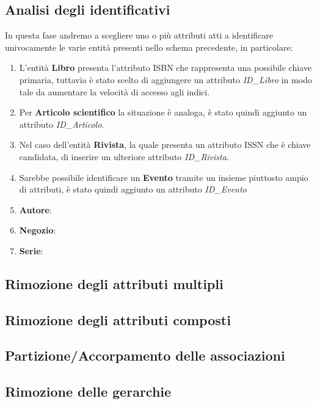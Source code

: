         \subsection{Analisi degli identificativi}
        In questa fase andremo a scegliere uno o più attributi atti a identificare univocamente
        le varie entità presenti nello schema precedente, in particolare:
            \begin{enumerate}
            \item L'entità \textbf{Libro} presenta l'attributo ISBN che rappresenta una possibile chiave primaria,
                  tuttavia è stato scelto di aggiungere un attributo \textit{ID\_Libro} in modo tale da aumentare
                  la velocità di accesso agli indici.
            \item Per \textbf{Articolo scientifico} la situazione è analoga, è stato quindi aggiunto un attributo
                  \textit{ID\_Articolo}.
            \item Nel caso dell'entità \textbf{Rivista}, la quale presenta un attributo ISSN che è chiave candidata,
                  di inserire un ulteriore attributo \textit{ID\_Rivista}.
            \item Sarebbe possibile identificare un \textbf{Evento} tramite un insieme piuttosto ampio di attributi, è
                  stato quindi aggiunto un attributo \textit{ID\_Evento}
            \item \textbf{Autore}: 
            \item \textbf{Negozio}:
            \item \textbf{Serie}: 
            \end{enumerate}
        \subsection{Rimozione degli attributi multipli}
            
        \subsection{Rimozione degli attributi composti}
            
        \subsection{Partizione/Accorpamento delle associazioni}
            
        \subsection{Rimozione delle gerarchie}
    
